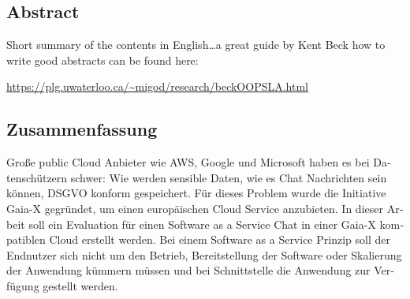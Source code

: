 \begingroup
\let\clearpage\relax
\let\cleardoublepage\relax
\let\cleardoublepage\relax

\begin{otherlanguage}{american}
	\chapter*{Abstract}
	Short summary of the contents in English\dots a great guide by
	Kent Beck how to write good abstracts can be found here:
	\begin{center}
		\url{https://plg.uwaterloo.ca/~migod/research/beckOOPSLA.html}
	\end{center}
\end{otherlanguage}

\newpage
\cleardoublepage

\begin{otherlanguage}{ngerman}
	\chapter*{Zusammenfassung}
	Große public Cloud Anbieter wie AWS, Google und Microsoft haben es bei Datenschützern schwer:
	Wie werden sensible Daten, wie es Chat Nachrichten sein können, DSGVO konform gespeichert.
	Für dieses Problem wurde die Initiative Gaia-X gegründet, um einen europäischen Cloud Service anzubieten.
	In dieser Arbeit soll ein Evaluation für einen Software as a Service Chat in einer Gaia-X kompatiblen Cloud erstellt werden.
	Bei einem Software as a Service Prinzip soll der Endnutzer sich nicht um den Betrieb, Bereitstellung der Software
	oder Skalierung der Anwendung kümmern müssen und bei Schnittstelle die Anwendung zur Verfügung gestellt werden.
	
\end{otherlanguage}

\endgroup

\vfill
